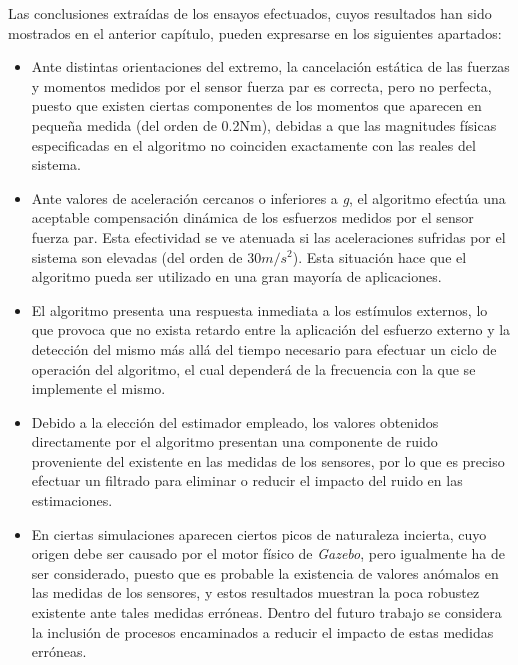 Las conclusiones extraídas de los ensayos efectuados, cuyos resultados han sido mostrados en el anterior capítulo, pueden expresarse en los siguientes apartados: 

\begin{itemize}

\item Ante distintas orientaciones del extremo, la cancelación estática de las fuerzas y momentos medidos por el sensor fuerza par es correcta, pero no perfecta, puesto que existen ciertas componentes de los momentos que aparecen en pequeña medida (del orden de 0.2Nm), debidas a que las magnitudes físicas especificadas en el algoritmo no coinciden exactamente con las reales del sistema. \par 

\item Ante valores de aceleración cercanos o inferiores a \emph{g}, el algoritmo efectúa una aceptable compensación dinámica de los esfuerzos medidos por el sensor fuerza par. Esta efectividad se ve atenuada si las aceleraciones sufridas por el sistema son elevadas (del orden de $30 m/{s^2}$). Esta situación hace que el algoritmo pueda ser utilizado en una gran mayoría de aplicaciones. \par 

\item El algoritmo presenta una respuesta inmediata a los estímulos externos, lo que provoca que no exista retardo entre la aplicación del esfuerzo externo y la detección del mismo más allá del tiempo necesario para efectuar un ciclo de operación del algoritmo, el cual dependerá de la frecuencia con la que se implemente el mismo. \par 

\item Debido a la elección del estimador empleado, los valores obtenidos directamente por el algoritmo presentan una componente de ruido proveniente del existente en las medidas de los sensores, por lo que es preciso efectuar un filtrado para eliminar o reducir el impacto del ruido en las estimaciones. \par 

\item En ciertas simulaciones aparecen ciertos picos de naturaleza incierta, cuyo origen debe ser causado por el motor físico de \emph{Gazebo}, pero igualmente ha de ser considerado, puesto que es probable la existencia de valores anómalos en las medidas de los sensores, y estos resultados muestran la poca robustez existente ante tales medidas erróneas. Dentro del futuro trabajo se considera la inclusión de procesos encaminados a reducir el impacto de estas medidas erróneas. \par 

\end{itemize}

